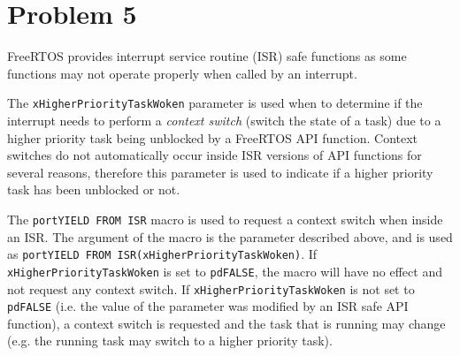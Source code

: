 \section*{Problem 5}
FreeRTOS provides interrupt service routine (ISR) safe functions as some functions may not operate properly when called by an interrupt. 

The \texttt{xHigherPriorityTaskWoken} parameter is used when to determine if the interrupt needs to perform a \textit{context switch} (switch the state of a task) due to a higher priority task being unblocked by a FreeRTOS API function. Context switches do not automatically occur inside ISR versions of API functions for several reasons, therefore this parameter is used to indicate if a higher priority task has been unblocked or not.

The \texttt{portYIELD\ FROM\ ISR} macro is used to request a context switch when inside an ISR. The argument of the macro is the parameter described above, and is used as \texttt{portYIELD\ FROM\ ISR(xHigherPriorityTaskWoken)}. If \texttt{xHigherPriorityTaskWoken} is set to \texttt{pdFALSE}, the macro will have no effect and not request any context switch. If \texttt{xHigherPriorityTaskWoken} is not set to \texttt{pdFALSE} (i.e. the value of the parameter was modified by an ISR safe API function), a context switch is requested and the task that is running may change (e.g. the running task may switch to a higher priority task).